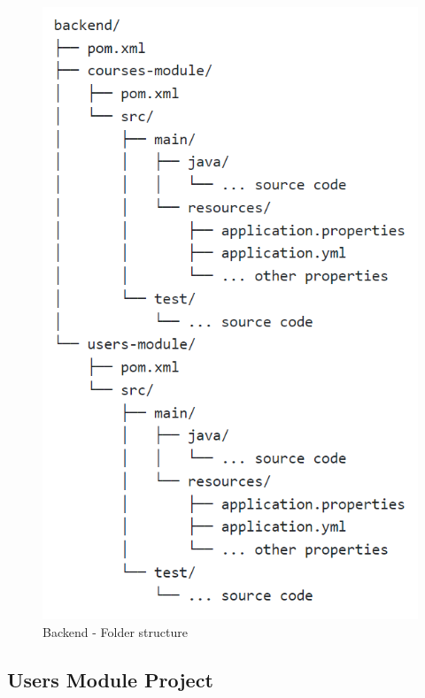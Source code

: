 \begin{figure}[h]
    \centering
    \includegraphics[scale=0.7]{images/backend-folder-structure.png}
    \caption{Backend - Folder structure}
    \label{fig:figure2}
\end{figure}

\subsection{Users Module Project} \label{Users Module Project}

